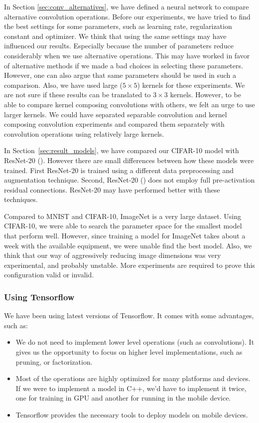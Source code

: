 In Section \ref{sec:conv_alternatives}, we have defined a neural network to compare alternative convolution operations. Before our experiments, we have tried to find the best settings for some parameters, such as learning rate, regularization constant and optimizer. We think that using the same settings may have influenced our results. Especially because the number of parameters reduce considerably when we use alternative operations. This may have worked in favor of alternative methods if we made a bad choices in selecting these parameters. However, one can also argue that same parameters should be used in such a comparison. Also, we have used large ($5 \times 5$) kernels for these experiments. We are not sure if these results can be translated to $3 \times 3$ kernels. However, to be able to compare kernel composing convolutions with others, we felt an urge to use larger kernels. We could have separated separable convolution and kernel composing convolution experiments and compared them separately with convolution operations using relatively large kernels. 

In Section~\ref{sec:result_models}, we have compared our CIFAR-10 model with ResNet-20 (\cite{He:2015aa}). However there are small differences between how these models were trained. First ResNet-20 is trained using a different data preprocessing and augmentation technique. Second, ResNet-20 (\cite{He:2015aa}) does not employ full pre-activation residual connections. ResNet-20 may have performed better with these techniques.

Compared to MNIST and CIFAR-10, ImageNet is a very large dataset. Using CIFAR-10, we were able to search the parameter space for the smallest model that perform well. However, since training a model for ImageNet takes about a week with the available equipment, we were unable find the best model. Also, we think that our way of aggressively reducing image dimensions was very experimental, and probably unstable. More experiments are required to prove this configuration valid or invalid.

\subsubsection{Using Tensorflow}
We have been using latest versions of Tensorflow. It comes with some advantages, such as:
\begin{itemize}
\item We do not need to implement lower level operations (such as convolutions). It gives us the opportunity to focus on higher level implementations, such as pruning, or factorization. 
\item Most of the operations are highly optimized for many platforms and devices. If we were to implement a model in C++, we'd have to implement it twice, one for training in GPU and another for running in the mobile device. 
\item Tensorflow provides the necessary tools to deploy models on mobile devices.
\end{itemize}

